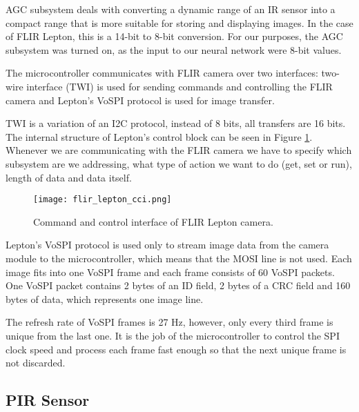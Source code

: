 AGC subsystem deals with converting a dynamic range of an IR sensor into a compact range that is more suitable for storing and displaying images.
In the case of FLIR Lepton, this is a 14-bit to 8-bit conversion.
For our purposes, the AGC subsystem was turned on, as the input to our neural network were 8-bit values.

The microcontroller communicates with FLIR camera over two interfaces: two-wire interface (TWI) is used for sending commands and controlling the FLIR camera and Lepton's VoSPI protocol is used for image transfer.

TWI is a variation of an I2C protocol, instead of 8 bits, all transfers are 16 bits.
The internal structure of Lepton's control block can be seen in Figure \ref{flir_lepton_cci}.
Whenever we are communicating with the FLIR camera we have to specify which subsystem are we addressing, what type of action we want to do (get, set or run), length of data and data itself.

\begin{figure}[ht]
        \centering
        \texttt{[image: flir\_lepton\_cci.png]} 
        \caption{ Command and control interface of FLIR Lepton camera.} 
        \label{flir_lepton_cci}
\end{figure}

Lepton's VoSPI protocol is used only to stream image data from the camera module to the microcontroller, which means that the MOSI line is not used.
Each image fits into one VoSPI frame and each frame consists of 60 VoSPI packets.
One VoSPI packet contains 2 bytes of an ID field, 2 bytes of a CRC field and 160 bytes of data\footnotemark, which represents one image line.

The refresh rate of VoSPI frames is 27 \si{\hertz}, however, only every third frame is unique from the last one.
It is the job of the microcontroller to control the SPI clock speed and process each frame fast enough so that the next unique frame is not discarded.


\subsection{ PIR Sensor}

